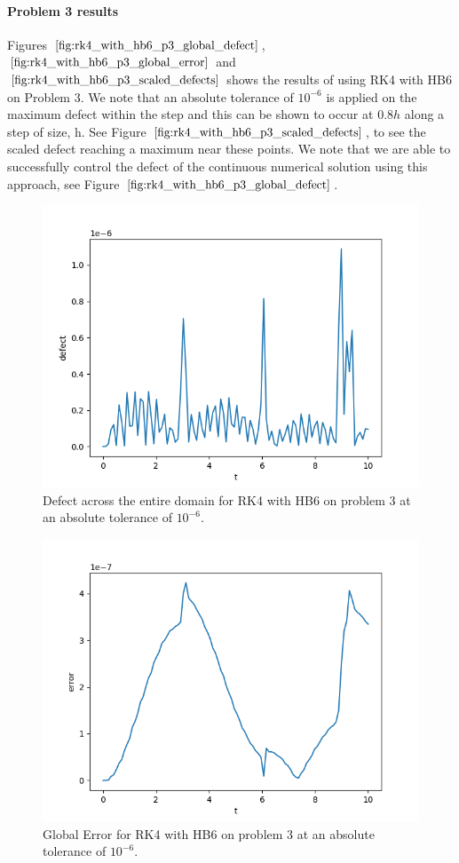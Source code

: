 \paragraph{Problem 3 results}
Figures $\ref{fig:rk4_with_hb6_p3_global_defect}$, $\ref{fig:rk4_with_hb6_p3_global_error}$ and $\ref{fig:rk4_with_hb6_p3_scaled_defects}$ shows the results of using RK4 with HB6 on Problem 3. We note that an absolute tolerance of $10^{-6}$ is applied on the maximum defect within the step and this can be shown to occur at $0.8h$ along a step of size, h. See Figure $\ref{fig:rk4_with_hb6_p3_scaled_defects}$, to see the scaled defect reaching a maximum near these points. We note that we are able to successfully control the defect of the continuous numerical solution using this approach, see Figure $\ref{fig:rk4_with_hb6_p3_global_defect}$. 


\begin{figure}[H]
\centering
\includegraphics[width=0.7\linewidth]{./figures/rk4_with_hb6_p3_global_defect}
\caption{Defect across the entire domain for RK4 with HB6 on problem 3 at an absolute tolerance of $10^{-6}$.}
\label{fig:rk4_with_hb6_p3_global_defect}
\end{figure}

\begin{figure}[H]
\centering
\includegraphics[width=0.7\linewidth]{./figures/rk4_with_hb6_p3_global_error}
\caption{Global Error for RK4 with HB6 on problem 3 at an absolute tolerance of $10^{-6}$.}
\label{fig:rk4_with_hb6_p3_global_error}
\end{figure}

